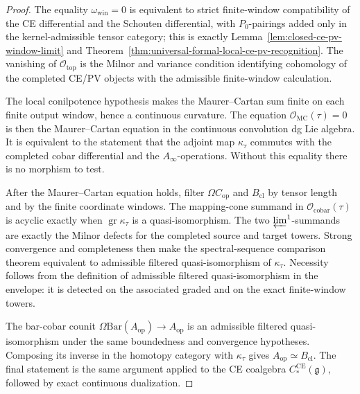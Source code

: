 \begin{proof}
  The equality \(\omega_{\mathrm{win}}=0\) is equivalent to strict
  finite-window compatibility of the CE differential and the Schouten
  differential, with \(P_0\)-pairings added only in the
  kernel-admissible tensor category; this is exactly
  Lemma~\ref{lem:closed-ce-pv-window-limit} and
  Theorem~\ref{thm:universal-formal-local-ce-pv-recognition}.  The
  vanishing of \(\mathcal O_{\mathrm{top}}\) is the Milnor and variance
  condition identifying cohomology of the completed CE/PV objects with
  the admissible finite-window calculation.

  The local conilpotence hypothesis makes the Maurer--Cartan sum finite
  on each finite output window, hence a continuous curvature.  The
  equation \(\mathcal O_{\mathrm{MC}}(\tau)=0\) is then the
  Maurer--Cartan equation in the continuous convolution dg Lie algebra.
  It is equivalent to the statement that the adjoint map
  \(\kappa_\tau\) commutes with the completed cobar differential and the
  \(A_\infty\)-operations.  Without this equality there is no morphism
  to test.

  After the Maurer--Cartan equation holds, filter
  \(\Omega C_{\mathrm{op}}\) and \(B_{\mathrm{cl}}\) by tensor length
  and by the finite coordinate windows.  The mapping-cone summand in
  \(\mathcal O_{\mathrm{cobar}}(\tau)\) is acyclic exactly when
  \(\operatorname{gr}\kappa_\tau\) is a quasi-isomorphism.  The two
  \(\varprojlim^1\)-summands are exactly the Milnor defects for the
  completed source and target towers.  Strong convergence and
  completeness then make the spectral-sequence comparison theorem
  equivalent to admissible filtered quasi-isomorphism of
  \(\kappa_\tau\).  Necessity follows from the definition of admissible
  filtered quasi-isomorphism in the envelope: it is detected on the
  associated graded and on the exact finite-window towers.

  The bar-cobar counit
  \(\Omega\mathrm{Bar}(A_{\mathrm{op}})\to A_{\mathrm{op}}\) is an
  admissible filtered quasi-isomorphism under the same boundedness and
  convergence hypotheses.  Composing its inverse in the homotopy
  category with \(\kappa_\tau\) gives
  \(A_{\mathrm{op}}\simeq B_{\mathrm{cl}}\).  The final statement is the
  same argument applied to the CE coalgebra
  \(C_*^{\mathrm{CE}}(\mathfrak g)\), followed by exact continuous
  dualization.
\end{proof}

